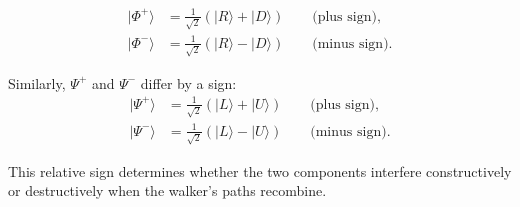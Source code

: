 \begin{align*}
  |\Phi^+\rangle &= \frac{1}{\sqrt{2}}(|R\rangle + |D\rangle)
                  \qquad \text{(plus sign)}, \\
  |\Phi^-\rangle &= \frac{1}{\sqrt{2}}(|R\rangle - |D\rangle)
                  \qquad \text{(minus sign)}.
\end{align*}

Similarly, $\Psi^+$ and $\Psi^-$ differ by a sign:
\begin{align*}
  |\Psi^+\rangle &= \frac{1}{\sqrt{2}}(|L\rangle + |U\rangle)
                  \qquad \text{(plus sign)}, \\
  |\Psi^-\rangle &= \frac{1}{\sqrt{2}}(|L\rangle - |U\rangle)
                  \qquad \text{(minus sign)}.
\end{align*}

This relative sign determines whether the two components interfere
constructively or destructively when the walker's paths recombine.
